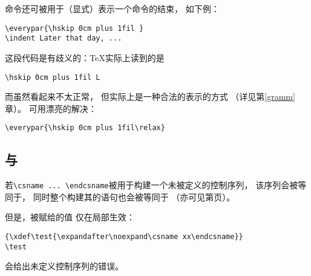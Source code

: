 \documentclass{book}
\begin{document}
命令还可被用于（显式）表示一个命令的结束，
如下例\label{fil:l:l}：
\begin{verbatim}
\everypar{\hskip 0cm plus 1fil }
\indent Later that day, ... 
\end{verbatim}
这段代码是有歧义的：{\TeX}实际上读到的是
\begin{verbatim}
\hskip 0cm plus 1fil L
\end{verbatim}
而\hbox{}虽然看起来不太正常，
但实际上是一种合法的表示的方式
（详见第\ref{gramm}章）。
可用漂亮的解决：
\begin{verbatim}
\everypar{\hskip 0cm plus 1fil\relax}
\end{verbatim}

\subsection{与}
\label{relax:cs}

若\verb-\csname ... \endcsname-被用于构建一个未被定义的控制序列，
该序列会被等同于，
同时整个构建其的语句也会被等同于
（亦可见第\pageref{cs:name}页）。

但是，被赋给的值
\altt
仅在局部生效：
\begin{verbatim}
{\xdef\test{\expandafter\noexpand\csname xx\endcsname}}
\test
\end{verbatim}
会给出未定义控制序列的错误。
\end{document}
